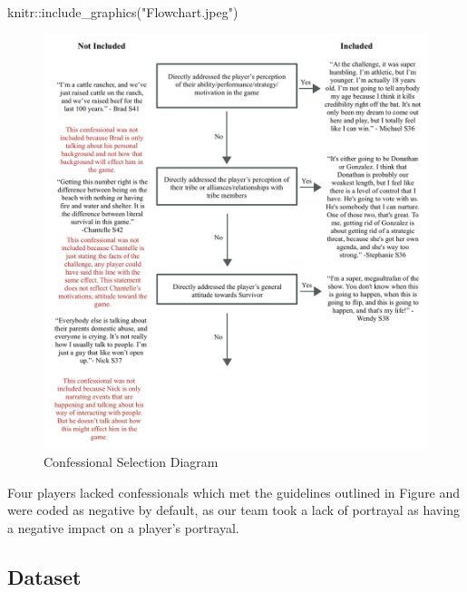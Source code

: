 \documentclass[
  letterpaper,
  DIV=11,
  numbers=noendperiod,
  oneside]{scrartcl}
\newenvironment{Shaded}{\begin{snugshade}}{\end{snugshade}}
\newcommand{\FunctionTok}[1]{\textcolor[rgb]{0.28,0.35,0.67}{#1}}
\newcommand{\NormalTok}[1]{\textcolor[rgb]{0.00,0.23,0.31}{#1}}
\newcommand{\SpecialCharTok}[1]{\textcolor[rgb]{0.37,0.37,0.37}{#1}}
\newcommand{\StringTok}[1]{\textcolor[rgb]{0.13,0.47,0.30}{#1}}
\begin{document}
\begin{Shaded}
\begin{Highlighting}[]
\NormalTok{knitr}\SpecialCharTok{::}\FunctionTok{include\_graphics}\NormalTok{(}\StringTok{"Flowchart.jpeg"}\NormalTok{)}
\end{Highlighting}
\end{Shaded}

\begin{figure}[H]

{\centering \includegraphics[width=4.6875in,height=\textheight]{Flowchart.jpeg}

}

\caption{Confessional Selection Diagram}

\end{figure}

Four players lacked confessionals which met the guidelines outlined in
Figure and were coded as negative by default, as our team took a lack of
portrayal as having a negative impact on a player's portrayal.

\hypertarget{dataset}{%
\subsection{Dataset}\label{dataset}}
\end{document}
